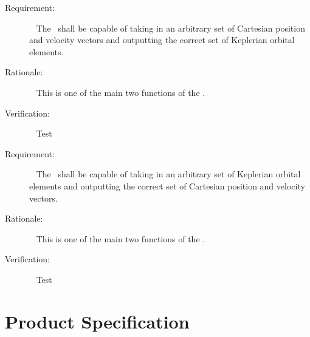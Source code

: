 %
%
%
%
%

\label{reqt:cart_convert}
\begin{description}
  \item[Requirement:]\ \newline
     The \OrbitalElement\ shall be capable of taking in an arbitrary
     set of Cartesian position and velocity vectors and outputting the
     correct set of Keplerian orbital elements.
  \item[Rationale:]\ \newline
    This is one of the main two functions of the \OrbitalElement.

  \item[Verification:]\ \newline
    Test
\end{description}

\label{reqt:elem_convert}
\begin{description}
  \item[Requirement:]\ \newline
     The \OrbitalElement\ shall be capable of taking in an arbitrary
     set of Keplerian orbital elements  and outputting the correct set
     of Cartesian position and velocity vectors.
  \item[Rationale:]\ \newline
    This is one of the main two functions of the \OrbitalElement.

  \item[Verification:]\ \newline
    Test
\end{description}

\chapter{Product Specification}\label{ch:spec}

